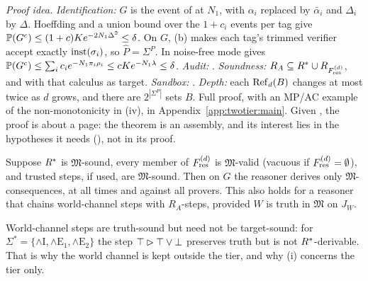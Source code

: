 \noindent\emph{Proof idea.} \emph{Identification:} $G$ is the event of  at $N_1$, with $\alpha_i$ replaced by $\bar\alpha_i$ and $\Delta_i$ by $\Delta$. Hoeffding and a union bound over the $1+c_i$ events per tag give $\mathbb{P}(G^c)\le(1+c)Ke^{-2N_1\Delta^2}\le\delta$. On $G$, (b) makes each tag's trimmed verifier accept exactly $\mathrm{inst}(\sigma_i)$, so $\hat P=\Sigma^P$. In noise-free mode  gives $\mathbb{P}(G^c)\le\sum_ic_ie^{-N_1\pi_i\rho_i}\le cKe^{-N_1\lambda}\le\delta$. \emph{Audit:} . \emph{Soundness:} $R_A\subseteq R^{*}\cup R_{F^{(d)}_{\mathrm{res}}}$, and  with that calculus as target. \emph{Sandbox:} . \emph{Depth:} each $\mathrm{Ref}_d(B)$ changes at most twice as $d$ grows, and there are $2^{|\Sigma^P|}$ sets $B$. Full proof, with an MP/AC example of the non-monotonicity in (iv), in Appendix~\ref{app:twotier:main}. Given , the proof is about a page: the theorem is an assembly, and its interest lies in the hypotheses it needs (), not in its proof.

\begin{corollary}\label{cor:twotier:truth}
Suppose $R^{*}$ is $\mathfrak M$-sound, every member of $F^{(d)}_{\mathrm{res}}$ is $\mathfrak M$-valid (vacuous if $F^{(d)}_{\mathrm{res}}=\emptyset$), and trusted steps, if used, are $\mathfrak M$-sound. Then on $G$ the reasoner derives only $\mathfrak M$-consequences, at all times and against all provers. This also holds for a reasoner that chains world-channel steps with $R_A$-steps, provided $W$ is truth in $\mathfrak M$ on $J_W$.
\end{corollary}

World-channel steps are truth-sound but need not be target-sound: for $\Sigma^*=\{\wedge\mathrm I,\wedge\mathrm E_1,\wedge\mathrm E_2\}$ the step $\top\rhd\top\vee\bot$ preserves truth but is not $R^{*}$-derivable. That is why the world channel is kept outside the tier, and why (i) concerns the tier only.

